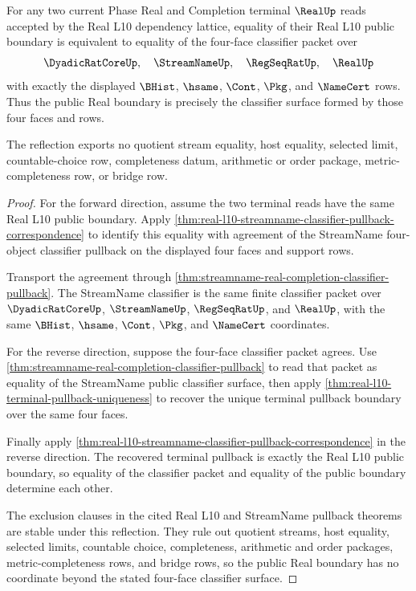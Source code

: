 \begin{theorem}
\label{thm:real-l10-public-boundary-classifier-reflection}
For any two current Phase Real and Completion terminal $\RealUp$ reads accepted by the Real L10 dependency lattice, equality of their Real L10 public boundary is equivalent to equality of the four-face classifier packet over
$$
\DyadicRatCoreUp,\quad \StreamNameUp,\quad \RegSeqRatUp,\quad \RealUp
$$
with exactly the displayed $\BHist$, $\hsame$, $\Cont$, $\Pkg$, and $\NameCert$ rows. Thus the public Real boundary is precisely the classifier surface formed by those four faces and rows.

The reflection exports no quotient stream equality, host equality, selected limit, countable-choice row, completeness datum, arithmetic or order package, metric-completeness row, or bridge row.
\end{theorem}
\begin{proof}
For the forward direction, assume the two terminal reads have the same Real L10 public boundary. Apply \autoref{thm:real-l10-streamname-classifier-pullback-correspondence} to identify this equality with agreement of the StreamName four-object classifier pullback on the displayed four faces and support rows.

Transport the agreement through \autoref{thm:streamname-real-completion-classifier-pullback}. The StreamName classifier is the same finite classifier packet over $\DyadicRatCoreUp$, $\StreamNameUp$, $\RegSeqRatUp$, and $\RealUp$, with the same $\BHist$, $\hsame$, $\Cont$, $\Pkg$, and $\NameCert$ coordinates.

For the reverse direction, suppose the four-face classifier packet agrees. Use \autoref{thm:streamname-real-completion-classifier-pullback} to read that packet as equality of the StreamName public classifier surface, then apply \autoref{thm:real-l10-terminal-pullback-uniqueness} to recover the unique terminal pullback boundary over the same four faces.

Finally apply \autoref{thm:real-l10-streamname-classifier-pullback-correspondence} in the reverse direction. The recovered terminal pullback is exactly the Real L10 public boundary, so equality of the classifier packet and equality of the public boundary determine each other.

The exclusion clauses in the cited Real L10 and StreamName pullback theorems are stable under this reflection. They rule out quotient streams, host equality, selected limits, countable choice, completeness, arithmetic and order packages, metric-completeness rows, and bridge rows, so the public Real boundary has no coordinate beyond the stated four-face classifier surface.
\end{proof}

